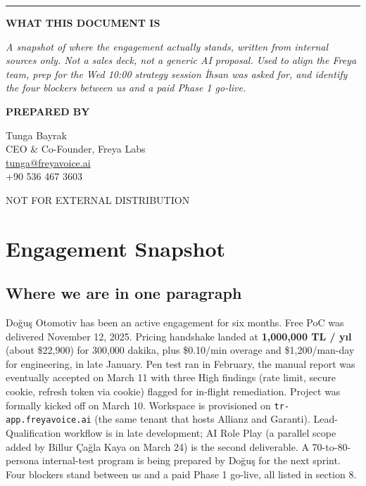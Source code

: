 \documentclass[10pt,a4paper]{article}
\begin{document}
\vspace{1em}
{\color{NavyDark}\rule{\linewidth}{0.4pt}}

\vfill

\begin{minipage}[t]{0.6\linewidth}
\textbf{\color{Light}\footnotesize WHAT THIS DOCUMENT IS}\par\medskip
\itshape\color{Ink}\fontsize{13}{19}\selectfont
A snapshot of where the engagement actually stands, written from internal sources only. Not a sales deck, not a generic AI proposal. Used to align the Freya team, prep for the Wed 10:00 strategy session İhsan was asked for, and identify the four blockers between us and a paid Phase 1 go-live.
\end{minipage}\hfill
\begin{minipage}[t]{0.35\linewidth}\raggedleft
\textbf{\color{Light}\footnotesize PREPARED BY}\par\medskip
\color{Ink} Tunga Bayrak \\
CEO \& Co-Founder, Freya Labs \\
\href{mailto:tunga@freyavoice.ai}{tunga@freyavoice.ai} \\
+90 536 467 3603
\end{minipage}

\vspace{2em}
{\color{Light}\footnotesize\sffamily NOT FOR EXTERNAL DISTRIBUTION}

\newpage

\setcounter{page}{2}
\section{Engagement Snapshot}

\subsection{Where we are in one paragraph}

Doğuş Otomotiv has been an active engagement for six months. Free PoC was delivered November 12, 2025. Pricing handshake landed at \textbf{1{,}000{,}000 TL / yıl} (about \$22{,}900) for 300{,}000 dakika, plus \$0.10/min overage and \$1{,}200/man-day for engineering, in late January. Pen test ran in February, the manual report was eventually accepted on March 11 with three High findings (rate limit, secure cookie, refresh token via cookie) flagged for in-flight remediation. Project was formally kicked off on March 10. Workspace is provisioned on \texttt{tr-app.freyavoice.ai} (the same tenant that hosts Allianz and Garanti). Lead-Qualification workflow is in late development; AI Role Play (a parallel scope added by Billur Çağla Kaya on March 24) is the second deliverable. A 70-to-80-persona internal-test program is being prepared by Doğuş for the next sprint. Four blockers stand between us and a paid Phase 1 go-live, all listed in section 8.
\end{document}

